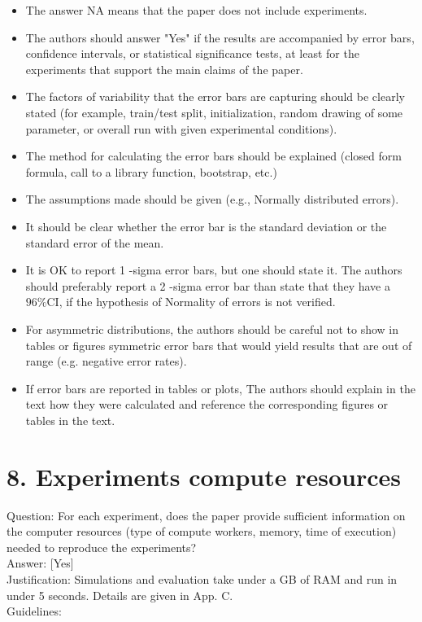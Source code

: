 \documentclass[10pt]{article}
\begin{document}
\begin{itemize}
  \item The answer NA means that the paper does not include experiments.
  \item The authors should answer "Yes" if the results are accompanied by error bars, confidence intervals, or statistical significance tests, at least for the experiments that support the main claims of the paper.
  \item The factors of variability that the error bars are capturing should be clearly stated (for example, train/test split, initialization, random drawing of some parameter, or overall run with given experimental conditions).
  \item The method for calculating the error bars should be explained (closed form formula, call to a library function, bootstrap, etc.)
  \item The assumptions made should be given (e.g., Normally distributed errors).
  \item It should be clear whether the error bar is the standard deviation or the standard error of the mean.
  \item It is OK to report 1 -sigma error bars, but one should state it. The authors should preferably report a 2 -sigma error bar than state that they have a $96 \% \mathrm{CI}$, if the hypothesis of Normality of errors is not verified.
  \item For asymmetric distributions, the authors should be careful not to show in tables or figures symmetric error bars that would yield results that are out of range (e.g. negative error rates).
  \item If error bars are reported in tables or plots, The authors should explain in the text how they were calculated and reference the corresponding figures or tables in the text.
\end{itemize}

\section*{8. Experiments compute resources}
Question: For each experiment, does the paper provide sufficient information on the computer resources (type of compute workers, memory, time of execution) needed to reproduce the experiments?\\[0pt]
Answer: [Yes]\\
Justification: Simulations and evaluation take under a GB of RAM and run in under 5 seconds. Details are given in App. C.\\
Guidelines:
\end{document}
